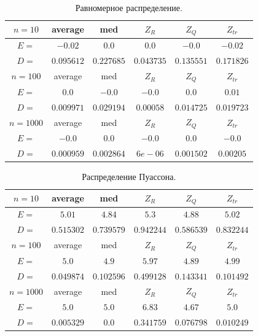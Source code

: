 \documentclass[a4]{article}
\begin{document}
\begin{table}[H]
	\caption{\label{tab:uniform} Равномерное распределение.}
	\begin{center}
		\begin{tabular}{|c|c|c|c|c|c|}
			\hline
			$n = 10$  & average & med & $Z_R$ & $Z_Q$ & $Z_{tr}$\\ \hline
			$E =$ &	$-0.02$  & 	$0.0$  & 	$0.0$    &	$-0.0$   &	$-0.02$  \\ \hline  
			$D =$ &	$0.095612$  &  $0.227685$  &  $0.043735$  &  $0.135551$  &  $0.171826$    \\ \hline
			
			$n = 100$  & average & med & $Z_R$ & $Z_Q$ & $Z_{tr}$\\ \hline
			$E =$  &	$0.0$   & 	$-0.0$   &	$-0.0$   &	$0.0$   & 	$0.01$    \\ \hline
			$D =$ &	$0.009971$   &  $0.029194$   &  $0.00058$   &  $0.014725$   &  $0.019723$  \\ \hline
			
			$n = 1000$  & average & med & $Z_R$ & $Z_Q$ & $Z_{tr}$\\ \hline
			$E =$  &  	$-0.0$    &	$0.0$    &	$-0.0 $  & 	$0.0$   & 	$-0.0$    \\ \hline
			$D =$ & $0.000959$   &  $0.002864$   &  $6e-06$   &  $0.001502$   &  $0.00205$    \\
			\hline
		\end{tabular}
	\end{center}
\end{table}

\begin{table}[H]
	\caption{\label{tab:poisson} Распределение Пуассона.}
	\begin{center}
		\begin{tabular}{|c|c|c|c|c|c|}
			\hline
			$n = 10$   & average & med & $Z_R$ & $Z_Q$ & $Z_{tr}$\\ \hline
			$E =$ & $5.01$ &  $4.84$ &  $5.3$ &  $4.88$ &  $5.02$    \\ \hline
			$D =$ & $0.515302$ &  $0.739579$ &  $0.942244$ &  $0.586539$ &  $0.832244$    \\ \hline
			
			$n = 100$   & average & med & $Z_R$ & $Z_Q$ & $Z_{tr}$\\ \hline
			$E =$ & $5.0$ &  $4.9$ &  $5.97$ &  $4.89$ &  $4.99$ \\ \hline
			$D =$ &	$0.049874$ &  $0.102596$ &  $0.499128$ &  $0.143341$ &  $0.101492$ \\ \hline
			
			$n = 1000$   & average & med & $Z_R$ & $Z_Q$ & $Z_{tr}$\\ \hline
			$E =$ & $5.0$ &  $5.0$ &  $6.83$ &  $4.67$ &  $5.0$    \\ \hline
			$D =$ & $0.005329$ &  $0.0$ &  $0.341759$ &  $0.076798$ &  $0.010249$    \\
			\hline
		\end{tabular}
	\end{center}
\end{table}
\end{document}
